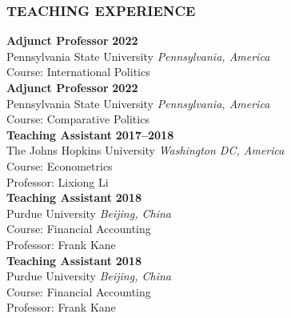 \subsubsection*{TEACHING EXPERIENCE}
\textbf{Adjunct Professor} \hfill \textbf{2022} \\
Pennsylvania State University \hfill \textit{Pennsylvania, America}\\
Course: International Politics
\\[12pt]
\noindent \textbf{Adjunct Professor} \hfill \textbf{2022} \\
Pennsylvania State University \hfill \textit{Pennsylvania, America}\\
Course: Comparative Politics
\\[12pt]
\noindent \textbf{Teaching Assistant} \hfill \textbf{2017--2018} \\
The Johns Hopkins University \hfill \textit{Washington DC, America}\\
Course: Econometrics \\
Professor: Lixiong Li
\\[12pt]
\noindent \textbf{Teaching Assistant} \hfill \textbf{2018} \\
Purdue University \hfill \textit{Beijing, China}\\
Course: Financial Accounting \\
Professor: Frank Kane
\\[12pt]
\noindent \textbf{Teaching Assistant} \hfill \textbf{2018} \\
Purdue University \hfill \textit{Beijing, China}\\
Course: Financial Accounting \\
Professor: Frank Kane
\\[8pt]

